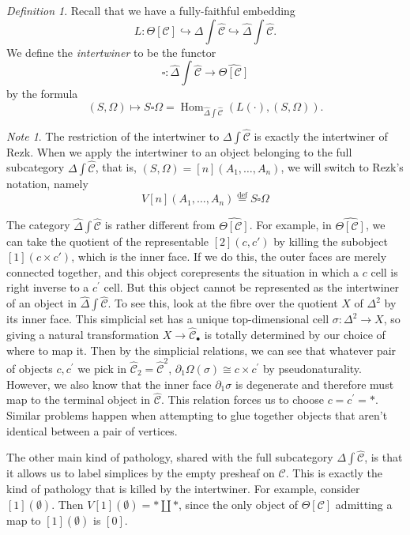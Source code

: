 \documentclass{amsart}
\numberwithin{equation}{section}
\theoremstyle{plain}   %
\theoremstyle{remark}
\newtheorem{note}[subsection]{Note}
\newtheorem{defn}[subsection]{Definition}
\theoremstyle{plain}
\DeclareMathOperator{\Hom}{Hom}
\newcommand{\psh}[1]{\ensuremath{\widehat{#1}}}
\newcommand{\C}{\ensuremath{\mathcal{C}}}
\newcommand{\defeq}{\overset{\mathrm{def}}=}
\newcommand{\cellset}{\ensuremath{\widehat{\Theta[\mathcal{C}]}}}
\begin{document}
\begin{defn} Recall that we have a fully-faithful embedding \[L:\Theta[\C]\hookrightarrow \Delta\int\psh{\C}\hookrightarrow \psh{\Delta}\int\psh{\C}.\]  We define the \emph{intertwiner} to be the functor \[\square:\psh{\Delta}\int\psh{\C} \to \cellset\] by the formula \[(S,\Omega)\mapsto S\square\Omega=\Hom_{\psh{\Delta}\int\psh{\C}}(L(\cdot), (S,\Omega)).\]
\end{defn}

\begin{note} The restriction of the intertwiner to \(\Delta \int \psh{\C}\) is exactly the intertwiner of Rezk.  When we apply the intertwiner to an object belonging to the full subcategory \(\Delta\int \psh{\C}\), that is, \((S,\Omega)=[n](A_1,\dots, A_n)\), we will switch to Rezk's notation, namely \[V[n](A_1,\dots,A_n)\defeq S\square \Omega\]
\end{note}

The category \(\psh{\Delta}\int \psh{\C}\) is rather different from \(\cellset\).  For example, in \(\cellset\), we can take the quotient of the representable \([2](c,c')\) by killing the subobject \([1](c\times c')\), which is the inner face.  If we do this, the outer faces are merely connected together, and this object corepresents the situation in which a \(c\) cell is right inverse to a \(c^\prime\) cell.  But this object cannot be represented as the intertwiner of an object in \(\psh{\Delta}\int \psh{\C}\).  To see this, look at the fibre over the quotient \(X\) of \(\Delta^2\) by its inner face.  This simplicial set has a unique top-dimensional cell \(\sigma:\Delta^2\to X\), so giving a natural transformation \(X\to \psh{\C}_\bullet\) is totally determined by our choice of where to map it.  Then by the simplicial relations, we can see that whatever pair of objects \(c,c^\prime\) we pick in \(\psh{\C}_2=\psh{\C}^2\), \(\partial_1 \Omega(\sigma)\cong c\times c^\prime\) by pseudonaturality.  However, we also know that the inner face \(\partial_1 \sigma\) is degenerate and therefore must map to the terminal object in \(\psh{\C}\).  This relation forces us to choose \(c=c^\prime=\ast\).  Similar problems happen when attempting to glue together objects that aren't identical between a pair of vertices.

The other main kind of pathology, shared with the full subcategory \(\Delta \int \psh{\C}\), is that it allows us to label simplices by the empty presheaf on \(\C\).  This is exactly the kind of pathology that is killed by the intertwiner.  For example, consider \([1](\emptyset)\).  Then \(V[1](\emptyset)=\ast \coprod \ast\), since the only object of \(\Theta[\C]\) admitting a map to \([1](\emptyset)\) is \([0]\).
\end{document}
